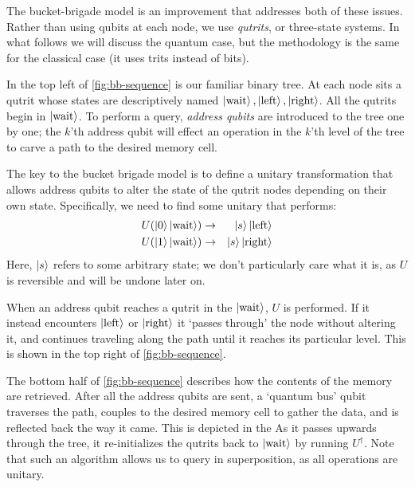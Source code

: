 \documentclass[a4paper,12pt]{article}
\begin{document}
The bucket-brigade model is an improvement that addresses both of these issues. Rather than using qubits at each node, we use \emph{qutrits}, or three-state systems. In what follows we will discuss the quantum case, but the methodology is the same for the classical case (it uses trits instead of bits).

In the top left of \autoref{fig:bb-sequence} is our familiar binary tree. At each node sits a qutrit whose states are descriptively named $\ket{\hbox{wait}}, \ket{\hbox{left}}, \ket{\hbox{right}}$. All the qutrits begin in $\ket{\hbox{wait}}$. To perform a query, \emph{address qubits} are introduced to the tree one by one; the $k$'th address qubit will effect an operation in the $k$'th level of the tree to carve a path to the desired memory cell.

The key to the bucket brigade model is to define a unitary transformation that allows address qubits to alter the state of the qutrit nodes depending on their own state. Specifically, we need to find some unitary that performs:
\begin{eqnarray}
 U(\ket{0}\ket{\hbox{wait}}) &\rightarrow& \ket{s}\ket{\hbox{left}} \\
 U(\ket{1}\ket{\hbox{wait}}) &\rightarrow& \ket{s}\ket{\hbox{right}}
\end{eqnarray}
Here, $\ket{s}$ refers to some arbitrary state; we don't particularly care what it is, as $U$ is reversible and will be undone later on.

When an address qubit reaches a qutrit in the $\ket{\hbox{wait}}$, $U$ is performed. If it instead encounters $\ket{\hbox{left}}$ or $\ket{\hbox{right}}$ it `passes through' the node without altering it, and continues traveling along the path until it reaches its particular level. This is shown in the top right of \autoref{fig:bb-sequence}.

The bottom half of \autoref{fig:bb-sequence} describes how the contents of the memory are retrieved. After all the address qubits are sent, a `quantum bus' qubit traverses the path, couples to the desired memory cell to gather the data, and is reflected back the way it came. This is depicted in the  As it passes upwards through the tree, it re-initializes the qutrits back to $\ket{\hbox{wait}}$ by running $U^\dag$. Note that such an algorithm allows us to query in superposition, as all operations are unitary.
\end{document}
